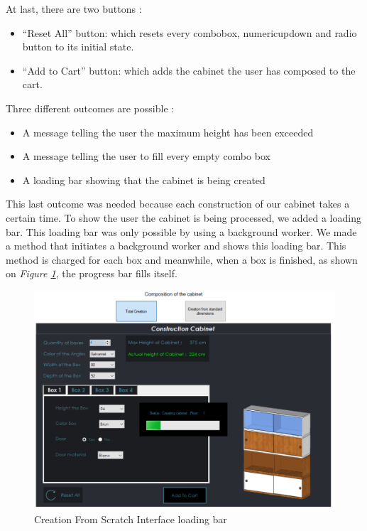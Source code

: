 \documentclass[12pt,oneside]{report}
\begin{document}
            At last, there are two buttons : 
            \begin{itemize}
                \item “Reset All” button: which resets every combobox, numericupdown and radio button to its initial state.
                \item “Add to Cart” button: which adds the cabinet the user has composed to the cart.
            \end{itemize}
            \vspace{\baselineskip}
            
            Three different outcomes are possible : 
            \begin{itemize}
                \item A message telling the user the maximum height has been exceeded 
                \item A message telling the user to fill every empty combo box 
                \item A loading bar showing that the cabinet is being created
            \end{itemize}
            \vspace{\baselineskip}
            
            This last outcome was needed because each construction of our cabinet takes a certain time. To show the user the cabinet is being processed, we added a loading bar. This loading bar was only possible by using a background worker. We made a method that initiates a background worker and shows this loading bar. This method is charged for each box and meanwhile, when a box is finished, as shown on \textit{Figure \ref{fig:LoadingBar}}, the progress bar fills itself.
            \vspace{\baselineskip}
            \vspace{\baselineskip}
            
            \begin{figure}[h!]
                \centering
    			\includegraphics[width = 1\textwidth]{Figures/CreationScratchLoading.PNG}
    			\caption{Creation From Scratch Interface loading bar}
    			\label{fig:LoadingBar}
    		\end{figure}
            \vspace{\baselineskip}
        
\end{document}
